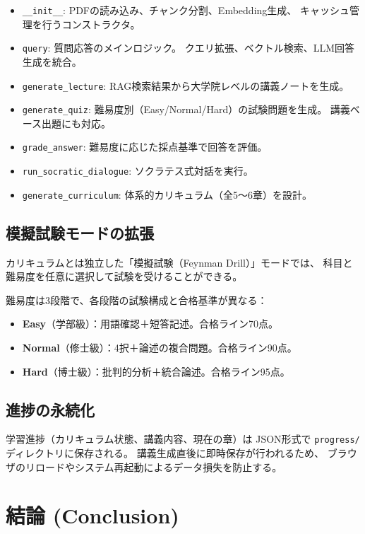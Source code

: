 \documentclass[uplatex, dvipdfmx, a4paper, 11pt]{jsarticle}
\begin{document}
\begin{itemize}
    \item \texttt{\_\_init\_\_}: PDFの読み込み、チャンク分割、Embedding生成、
          キャッシュ管理を行うコンストラクタ。
    \item \texttt{query}: 質問応答のメインロジック。
          クエリ拡張、ベクトル検索、LLM回答生成を統合。
    \item \texttt{generate\_lecture}: RAG検索結果から大学院レベルの講義ノートを生成。
    \item \texttt{generate\_quiz}: 難易度別（Easy/Normal/Hard）の試験問題を生成。
          講義ベース出題にも対応。
    \item \texttt{grade\_answer}: 難易度に応じた採点基準で回答を評価。
    \item \texttt{run\_socratic\_dialogue}: ソクラテス式対話を実行。
    \item \texttt{generate\_curriculum}: 体系的カリキュラム（全5〜6章）を設計。
\end{itemize}

\subsection{模擬試験モードの拡張}
カリキュラムとは独立した「模擬試験（Feynman Drill）」モードでは、
科目と難易度を任意に選択して試験を受けることができる。

難易度は3段階で、各段階の試験構成と合格基準が異なる：
\begin{itemize}
    \item \textbf{Easy}（学部級）：用語確認＋短答記述。合格ライン70点。
    \item \textbf{Normal}（修士級）：4択＋論述の複合問題。合格ライン90点。
    \item \textbf{Hard}（博士級）：批判的分析＋統合論述。合格ライン95点。
\end{itemize}

\subsection{進捗の永続化}
学習進捗（カリキュラム状態、講義内容、現在の章）は
JSON形式で \texttt{progress/} ディレクトリに保存される。
講義生成直後に即時保存が行われるため、
ブラウザのリロードやシステム再起動によるデータ損失を防止する。


\section{結論 (Conclusion)}
\end{document}
